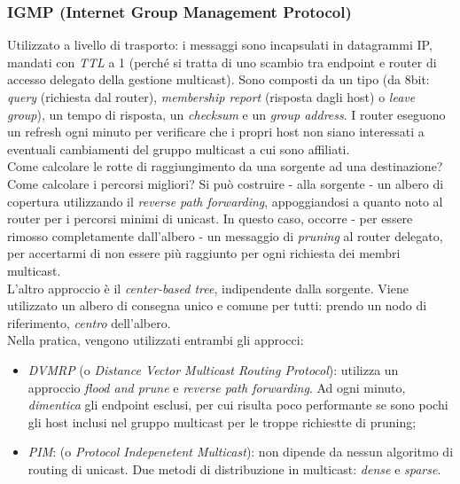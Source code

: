 \subsubsection{IGMP (Internet Group Management Protocol)}
Utilizzato a livello di trasporto: i messaggi sono incapsulati in datagrammi IP, mandati con \textit{TTL} a 1 (perché si tratta di uno scambio tra endpoint e router di accesso delegato della gestione multicast). Sono composti da un tipo (da 8bit: \textit{query} (richiesta dal router), \textit{membership report} (risposta dagli host) o \textit{leave group}), un tempo di risposta, un \textit{checksum} e un \textit{group address}. I router eseguono un refresh ogni minuto per verificare che i propri host non siano interessati a eventuali cambiamenti del gruppo multicast a cui sono affiliati. \\
Come calcolare le rotte di raggiungimento da una sorgente ad una destinazione? Come calcolare i percorsi migliori? Si può costruire - alla sorgente - un albero di copertura utilizzando il \textit{reverse path forwarding}, appoggiandosi a quanto noto al router per i percorsi minimi di unicast. In questo caso, occorre - per essere rimosso completamente dall'albero - un messaggio di \textit{pruning} al router delegato, per accertarmi di non essere più raggiunto per ogni richiesta dei membri multicast. \\
L'altro approccio è il \textit{center-based tree}, indipendente dalla sorgente. Viene utilizzato un albero di consegna unico e comune per tutti: prendo un nodo di riferimento, \textit{centro} dell'albero. \\
Nella pratica, vengono utilizzati entrambi gli approcci:
\begin{itemize}
	\item \textit{DVMRP} (o \textit{Distance Vector Multicast Routing Protocol}): utilizza un approccio \textit{flood and prune} e \textit{reverse path forwarding}. Ad ogni minuto, \textit{dimentica} gli endpoint esclusi, per cui risulta poco performante se sono pochi gli host inclusi nel gruppo multicast per le troppe richiestte di pruning;
	\item \textit{PIM}: (o \textit{Protocol Indepenetent Multicast}): non dipende da nessun algoritmo di routing di unicast. Due metodi di distribuzione in multicast: \textit{dense} e \textit{sparse}.
\end{itemize}